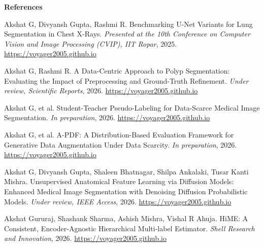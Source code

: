 \documentclass[11pt]{article}
\begin{document}
{\footnotesize
\textbf{References}
\begin{enumerate}[leftmargin=1.3em, itemsep=1pt, label={[\arabic*]}]
\item \label{ref1} Akshat G, Divyansh Gupta, Rashmi R. Benchmarking U-Net Variants for Lung Segmentation in Chest X-Rays. \emph{Presented at the 10th Conference on Computer Vision and Image Processing (CVIP), IIT Ropar}, 2025. \url{https://voyager2005.github.io}
\item \label{ref2} Akshat G, Rashmi R. A Data-Centric Approach to Polyp Segmentation: Evaluating the Impact of Preprocessing and Ground-Truth Refinement. \emph{Under review, Scientific Reports}, 2026. \url{https://voyager2005.github.io}
\item \label{ref3} Akshat G, et al. Student-Teacher Pseudo-Labeling for Data-Scarce Medical Image Segmentation. \emph{In preparation}, 2026. \url{https://voyager2005.github.io}
\item \label{ref4} Akshat G, et al. A-PDF: A Distribution-Based Evaluation Framework for Generative Data Augmentation Under Data Scarcity. \emph{In preparation}, 2026. \url{https://voyager2005.github.io}
\item \label{ref5} Akshat G, Divyansh Gupta, Shaleen Bhatnagar, Shilpa Ankalaki, Tusar Kanti Mishra. Unsupervised Anatomical Feature Learning via Diffusion Models: Enhanced Medical Image Segmentation with Denoising Diffusion Probabilistic Models. \emph{Under review, IEEE Access}, 2026. \url{https://voyager2005.github.io}
\item \label{ref6} Akshat Gururaj, Shashank Sharma, Ashish Mishra, Vishal R Ahuja. HiME: A Consistent, Encoder-Agnostic Hierarchical Multi-label Estimator. \emph{Shell Research and Innovation}, 2026. \url{https://voyager2005.github.io}
\end{enumerate}
}
\end{document}
